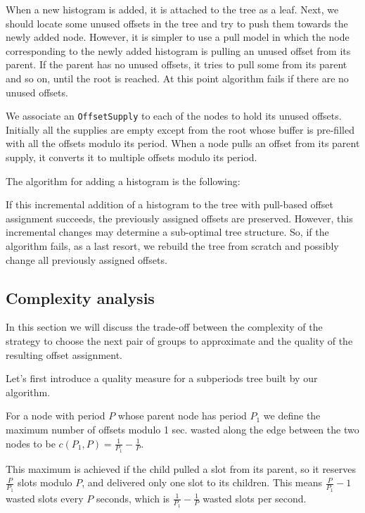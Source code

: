 When a new histogram is added, it is attached to the tree as a leaf. Next, we should locate some unused offsets in the tree and try to push them towards the newly added node. However, it is simpler to use a pull model in which the node corresponding to the newly added histogram is pulling an unused offset from its parent. If the parent has no unused offsets, it tries to pull some from its parent and so on, until the root is reached. At this point algorithm fails if there are no unused offsets.

We associate an {\tt OffsetSupply} to each of the nodes to hold its unused offsets. Initially all the supplies are empty except from the root whose buffer is pre-filled with all the offsets modulo its period. When a node pulls an offset from its parent supply, it converts it to multiple offsets modulo its period.

The algorithm for adding a histogram is the following:

If this incremental addition of a histogram to the tree with pull-based offset assignment succeeds, the previously assigned offsets are preserved. However, this incremental changes may determine a sub-optimal tree structure. So, if the algorithm fails, as a last resort, we rebuild the tree from scratch and possibly change all previously assigned offsets.

\subsection{Complexity analysis}

In this section we will discuss the trade-off between the complexity of the strategy to choose the next pair of groups to approximate and the quality of the resulting offset assignment.

Let's first introduce a quality measure for a subperiods tree built by our algorithm. 

\begin{definition}
For a node with period $P$ whose parent node has period $P_1$ we define the maximum number of offsets modulo 1 sec. wasted along the edge between the two nodes to be $c(P_1,P)=\frac{1}{P_1}-\frac 1 P$.
\end{definition}

This maximum is achieved if the child pulled a slot from its parent, so it reserves $\frac P {P_1}$ slots modulo $P$, and delivered only one slot to its children. This means $\frac P {P_1}-1$ wasted slots every $P$ seconds, which is $\frac 1 {P_1}- \frac 1 P$ wasted slots per second. 

